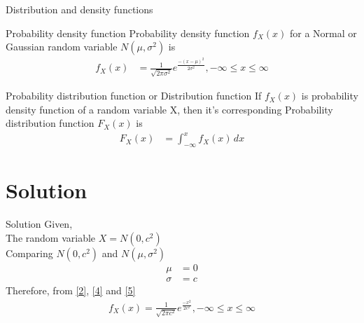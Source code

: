 \documentclass{beamer}
\begin{document}
\begin{frame}{Distribution and density functions}
\begin{block}{Probability density function}
    Probability density function $f_X(x)$ for a Normal or Gaussian random variable $N(\mu,\sigma^2)$ is 
    \begin{align}
    f_X(x)&=\frac{1}{\sqrt{2\pi\sigma^2}} e^{\frac{-(x-\mu)^2}{2\sigma^2}}, -\infty \leq x \leq \infty
    \label{2}
\end{align}
\end{block}

\begin{block}{Probability distribution function or Distribution function}
    If $f_X(x)$ is probability density function of a random variable X, then it's corresponding Probability distribution function $F_X(x)$ is 
    \begin{align}
        F_X(x) &= \int_{-\infty}^{x} f_X(x) \, dx \label{eq3}
    \end{align}
\end{block}

\end{frame}


\section{Solution}
\begin{frame}{Solution}
Given,\\
The random variable     $X = N(0,c^2)$\\
\vspace{5pt}
Comparing $N(0,c^2)$ and $N(\mu,\sigma^2)$
\begin{align}
    \mu &= 0 \label{4}\\
    \sigma &= c\label{5}
\end{align}
Therefore, from \eqref{2}, \eqref{4} and \eqref{5}
\begin{align}
    f_X(x)=\frac{1}{\sqrt{2\pi c^2}} e^{\frac{-x^2}{2c^2}}, -\infty \leq x \leq \infty \label{6}
\end{align}
\end{frame}
\end{document}
